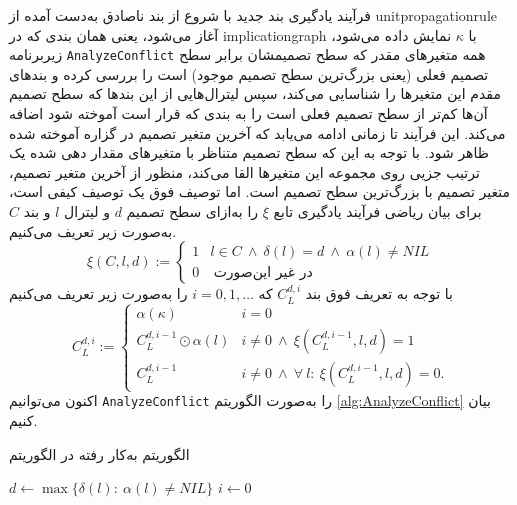 فرآیند یادگیری بند جدید با شروع از بند ناصادق به‌دست آمده از  
\gls*{unitpropagationrule}
آغاز می‌شود، یعنی همان بندی که در 
\gls*{implicationgraph}
با 
$\kappa$
نمایش داده می‌شود، زیربرنامه 
\texttt{AnalyzeConflict}
همه متغیرهای مقدر که سطح تصمیمشان برابر سطح تصمیم فعلی (یعنی بزرگ‌ترین سطح تصمیم موجود)  است را  بررسی کرده و بندهای مقدم این متغیرها را شناسایی می‌کند، سپس لیترال‌هایی از این بندها که سطح تصمیم آن‌ها کم‌تر از سطح تصمیم فعلی است را به بندی که قرار است آموخته شود اضافه می‌کند. این فرآیند تا زمانی  ادامه می‌یابد که آخرین متغیر تصمیم در گزاره آموخته شده ظاهر شود.  با توجه به این که سطح تصمیم متناظر با متغیرهای مقدار دهی شده یک ترتیب جزیی روی مجموعه این متغیرها القا می‌کند، منظور از آخرین متغیر تصمیم، متغیر تصمیم با بزرگ‌ترین سطح تصمیم است.  اما توصیف فوق یک توصیف کیفی است، برای بیان ریاضی فرآیند یادگیری تابع 
$\xi$
را  به‌ازای سطح تصمیم 
$d$
و لیترال 
$l$
و  بند 
$C$
به‌صورت زیر تعریف می‌کنیم. 
\begin{equation*}
\xi(C, l, d):= \left \{
\begin{array}{ll}
1& l\in C\ \wedge \ \delta(l) = d \ \wedge \ \alpha(l) \neq NIL\\
0 & \ \text{در غیر این‌صورت}
\end{array}
\right.
\end{equation*}
با توجه به تعریف فوق بند 
$C_{L}^{d,i}$
که 
$i = 0, 1, \ldots$
را به‌صورت زیر تعریف می‌کنیم 
\begin{equation}
\label{learning_equation1}
C_{L}^{d, i}:=\left\{ 
\begin{array}{ll}
\alpha(\kappa)& i = 0\\
C_{L}^{d, i-1}\odot \alpha(l)& i \neq 0\ \wedge\ \xi(C_{L}^{d, i-1}, l, d) = 1\\
C_{L}^{d, i-1}& i\neq 0 \ \wedge \ \forall \ l : \ \xi(C_{L}^{d, i-1}, l, d) = 0.
\end{array}
\right.
\end{equation}
اکنون می‌توانیم  
\texttt{AnalyzeConflict}
را به‌صورت الگوریتم 
\ref{alg:AnalyzeConflict}
بیان کنیم. 
\begin{algorithm}
	\renewcommand{\algorithmicrequire}{\textbf{Input:}}
	\renewcommand{\algorithmicensure}{\textbf{Output:}}
	\caption{الگوریتم  
		به‌کار رفته در الگوریتم 
	}
	\label{alg:AnalyzeConflict}
	\begin{latin}
		\begin{algorithmic}[1]
			\STATE $d\gets \max\{\delta(l): \ \alpha(l)\neq NIL\}$
			\STATE $i \gets 0$
			\REPEAT 
			\ELSE
			\ENDIF			
			\EndFunction
		\end{algorithmic}
	\end{latin}
\end{algorithm}
